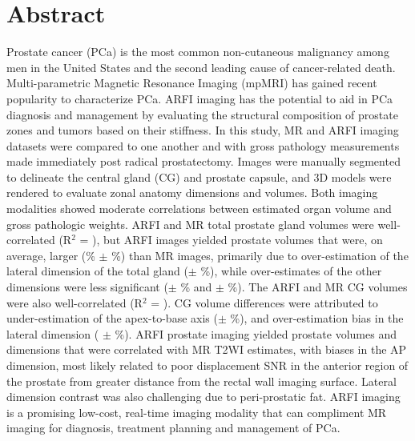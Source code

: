 \section*{Abstract}
Prostate cancer (PCa) is the most common non-cutaneous malignancy among men in
the United States and the second leading cause of cancer-related death.
Multi-parametric Magnetic Resonance Imaging (mpMRI) has gained recent
popularity to characterize PCa.  ARFI imaging has the potential to aid in PCa
diagnosis and management by evaluating the structural composition of prostate
zones and tumors based on their stiffness.  In this study, MR and ARFI imaging
datasets were compared to one another and with gross pathology measurements
made immediately post radical prostatectomy.  Images were manually segmented to
delineate the central gland (CG) and prostate capsule, and 3D models were
rendered to evaluate zonal anatomy dimensions and volumes.  Both imaging
modalities showed moderate correlations between estimated organ volume and
gross pathologic weights.  ARFI and MR total prostate gland volumes were
well-correlated (R$^2$ = \MRarfiVolTotalRsq), but ARFI images yielded prostate volumes that
were, on average, larger (\MRarfiVolTotalMeanDiff\% $\pm$ \MRarfiVolTotalStdDiff\%) than MR images, primarily due to
over-estimation of the lateral dimension of the total gland
(\ARFImrTotalLatLatMeanPct $\pm$ \ARFImrTotalLatLatStdPct\%), while
over-estimates of the other dimensions were less significant
(\ARFImrTotalAntPostMeanPct $\pm$ \ARFImrTotalAntPostStdPct\% and
\ARFImrTotalApexBaseMeanPct $\pm$ \ARFImrTotalApexBaseStdPct\%).  The ARFI and
MR CG volumes were also well-correlated (R$^2$ = \MRarfiVolCentralRsq).  CG volume
differences were attributed to under-estimation of the apex-to-base axis
(\ARFImrCentralApexBaseMeanPct $\pm$ \ARFImrCentralApexBaseStdPct\%), and
over-estimation bias in the lateral dimension (\ARFImrCentralLatLatMeanPct
$\pm$ \ARFImrCentralLatLatStdPct\%).  ARFI prostate imaging yielded prostate
volumes and dimensions that were correlated with MR T2WI estimates, with biases
in the AP dimension, most likely related to poor displacement SNR in the
anterior region of the prostate from greater distance from the rectal wall
imaging surface.  Lateral dimension contrast was also challenging due to
peri-prostatic fat.  ARFI imaging is a promising low-cost, real-time imaging
modality that can compliment MR imaging for diagnosis, treatment planning and
management of PCa.
